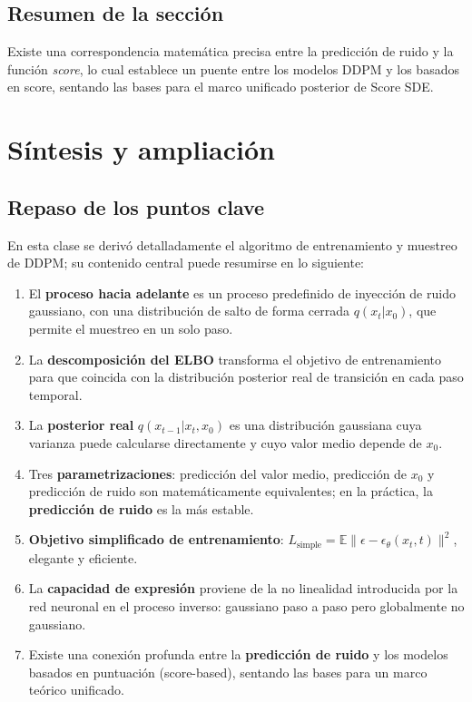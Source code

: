 \documentclass[a4paper]{article}
\begin{document}
\subsection{Resumen de la sección}

Existe una correspondencia matemática precisa entre la predicción de ruido y la función \textit{score}, lo cual establece un puente entre los modelos DDPM y los basados en score, sentando las bases para el marco unificado posterior de Score SDE.



\section{Síntesis y ampliación}

\subsection{Repaso de los puntos clave}

En esta clase se derivó detalladamente el algoritmo de entrenamiento y muestreo de DDPM; su contenido central puede resumirse en lo siguiente:

\begin{enumerate}
    \item El \textbf{proceso hacia adelante} es un proceso predefinido de inyección de ruido gaussiano, con una distribución de salto de forma cerrada $q(x_t|x_0)$, que permite el muestreo en un solo paso.
    \item La \textbf{descomposición del ELBO} transforma el objetivo de entrenamiento para que coincida con la distribución posterior real de transición en cada paso temporal.
    \item La \textbf{posterior real} $q(x_{t-1}|x_t, x_0)$ es una distribución gaussiana cuya varianza puede calcularse directamente y cuyo valor medio depende de $x_0$.
    \item Tres \textbf{parametrizaciones}: predicción del valor medio, predicción de $x_0$ y predicción de ruido son matemáticamente equivalentes; en la práctica, la \textbf{predicción de ruido} es la más estable.
    \item \textbf{Objetivo simplificado de entrenamiento}: $L_{\text{simple}} = \mathbb{E}\|\epsilon - \epsilon_\theta(x_t, t)\|^2$, elegante y eficiente.
    \item La \textbf{capacidad de expresión} proviene de la no linealidad introducida por la red neuronal en el proceso inverso: gaussiano paso a paso pero globalmente no gaussiano.
    \item Existe una conexión profunda entre la \textbf{predicción de ruido} y los modelos basados en puntuación (score-based), sentando las bases para un marco teórico unificado.
\end{enumerate}
\end{document}

